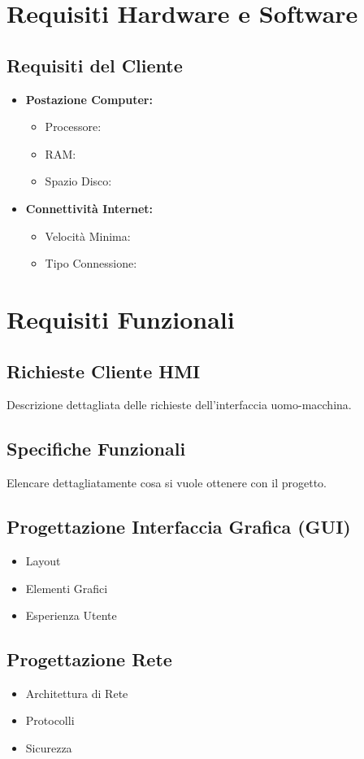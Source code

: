 \documentclass[a4paper,12pt]{article}
\begin{document}
\section{Requisiti Hardware e Software}
\subsection{Requisiti del Cliente}
\begin{itemize}
    \item \textbf{Postazione Computer:}
    \begin{itemize}
        \item Processore: 
        \item RAM: 
        \item Spazio Disco:
    \end{itemize}
    
    \item \textbf{Connettività Internet:}
    \begin{itemize}
        \item Velocità Minima:
        \item Tipo Connessione:
    \end{itemize}
\end{itemize}

\section{Requisiti Funzionali}
\subsection{Richieste Cliente HMI}
Descrizione dettagliata delle richieste dell'interfaccia uomo-macchina.

\subsection{Specifiche Funzionali}
Elencare dettagliatamente cosa si vuole ottenere con il progetto.

\subsection{Progettazione Interfaccia Grafica (GUI)}
\begin{itemize}
    \item Layout
    \item Elementi Grafici
    \item Esperienza Utente
\end{itemize}

\subsection{Progettazione Rete}
\begin{itemize}
    \item Architettura di Rete
    \item Protocolli
    \item Sicurezza
\end{itemize}
\end{document}
